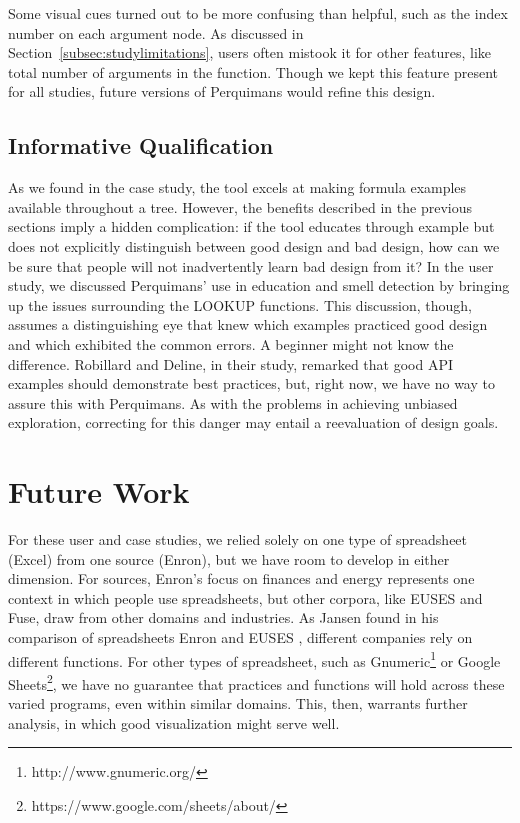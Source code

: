 \documentclass[conference]{IEEEtran}
\newcommand{\toolname}{Perquimans\xspace} \newcommand{\toolnameend}{Perquimans}
\newcommand{\toolnameposs}{Perquimans' }
\begin{document}
	Some visual cues turned out to be more confusing than helpful, such as
	the index number on each argument node. As discussed in Section~\ref{subsec:studylimitations},
	users often mistook it for other features, like total number of arguments in the
	function. Though we kept this feature present for all studies, future versions
	of \toolname would refine this design. 
	
	\subsection{Informative Qualification}
	
	As we found in the case study, the tool excels at making formula examples
	available throughout a tree. However, the benefits described in the previous
	sections imply a hidden complication: if the tool educates through example but
	does not explicitly distinguish between good design and bad design, how can we
	be sure that people will not inadvertently learn bad design from it? In the
	user study, we discussed \toolnameposs use in education and smell detection by bringing
	up the issues surrounding the LOOKUP functions. This discussion, though,
	assumes a distinguishing eye that knew which examples practiced good design
	and which exhibited the common errors. A beginner might not know the
	difference. Robillard and Deline, in their study, remarked that good API
	examples should demonstrate best practices, but, right now, we have no way to
	assure this with \toolnameend. As with the problems in achieving unbiased
	exploration, correcting for this danger may entail a reevaluation of design
	goals.
	
	\section{Future Work}
	
	For these user and case studies, we relied solely on one type of spreadsheet (Excel)
	from one source (Enron), but we have room to develop in either dimension. For sources, 
	Enron's focus on finances and energy represents one context in
	which people use spreadsheets, but other corpora, like EUSES and Fuse, draw from
	other domains and industries. As Jansen found in his comparison of
	spreadsheets Enron and EUSES \cite{jansen2015enron}, different companies rely
	on different functions. For other types of spreadsheet, such as Gnumeric\footnote{http://www.gnumeric.org/} or Google
	Sheets\footnote{https://www.google.com/sheets/about/}, we have no
	guarantee that practices and functions will hold across these varied programs, even within
	similar domains. This, then, warrants further analysis, in which good visualization might serve
	well. 
	
\end{document}
